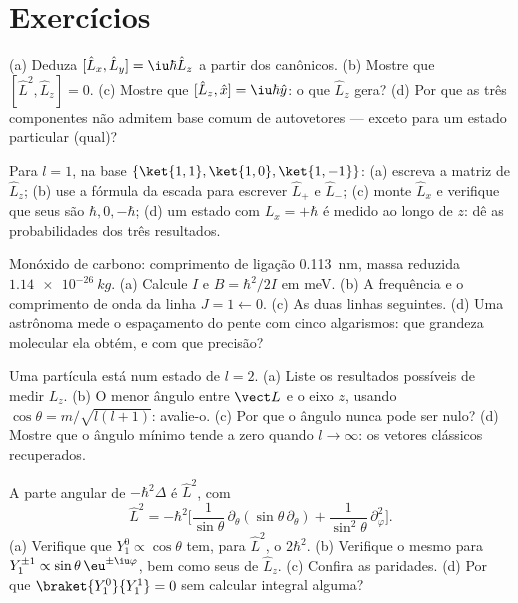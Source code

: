 \section{Exercícios}

\begin{exercise}[$\star$]\label{exo:b3:quantum-angular-momentum:1}
(a) Deduza $[\hat L_x, \hat L_y] = \iu\hbar\hat L_z$ a partir dos
 canônicos. (b) Mostre que $[\hat L^2, \hat L_z] = 0$. (c)
Mostre que $[\hat L_z, \hat x] = \iu\hbar\hat y$: o que $\hat L_z$
gera? (d) Por que as três componentes não admitem base comum de
autovetores --- exceto para um estado particular (qual)?
\end{exercise}

\begin{exercise}[$\star$]\label{exo:b3:quantum-angular-momentum:2}
Para $l = 1$, na base $\{\ket{1,1}, \ket{1,0}, \ket{1,-1}\}$:
(a) escreva a matriz de $\hat L_z$; (b) use a fórmula da escada para
escrever $\hat L_+$ e $\hat L_-$; (c) monte $\hat L_x$ e verifique que
seus  são $\hbar, 0, -\hbar$; (d) um estado com $L_x =
+\hbar$ é medido ao longo de $z$: dê as probabilidades dos três
resultados.
\end{exercise}

\begin{exercise}[$\star$]\label{exo:b3:quantum-angular-momentum:3}
Monóxido de carbono: comprimento de ligação \qty{0.113}{nm}, massa
reduzida $\qty{1.14e-26}{kg}$. (a) Calcule $I$ e $B = \hbar^2/2I$ em
meV. (b) A frequência e o comprimento de onda da linha
$J = 1 \leftarrow 0$. (c) As duas linhas seguintes. (d) Uma astrônoma
mede o espaçamento do pente com cinco algarismos: que grandeza
molecular ela obtém, e com que precisão?
\end{exercise}

\begin{exercise}[$\star$]\label{exo:b3:quantum-angular-momentum:4}
Uma partícula está num estado de $l = 2$. (a) Liste os resultados
possíveis de medir $L_z$. (b) O menor ângulo entre $\vect L$ e o eixo
$z$, usando $\cos\theta = m/\sqrt{l(l+1)}$: avalie-o. (c) Por que o
ângulo nunca pode ser nulo? (d) Mostre que o ângulo mínimo tende a zero
quando $l \to \infty$: os vetores clássicos recuperados.
\end{exercise}

\begin{exercise}[$\star\star$]\label{exo:b3:quantum-angular-momentum:5}
A parte angular de $-\hbar^2\Delta$ é $\hat L^2$, com
\[
\hat L^2 = -\hbar^2\Big[\frac{1}{\sin\theta}\,\partial_\theta
(\sin\theta\,\partial_\theta) +
\frac{1}{\sin^2\theta}\,\partial_\varphi^2\Big] .
\]
(a) Verifique que $Y_1^0 \propto \cos\theta$ tem, para $\hat L^2$, o 
$2\hbar^2$. (b) Verifique o mesmo para $Y_1^{\pm1} \propto \sin\theta\,
\eu^{\pm\iu\varphi}$, bem como seus  de $\hat L_z$. (c)
Confira as paridades. (d) Por que $\braket{Y_1^0}{Y_1^1} = 0$ sem
calcular integral alguma?
\end{exercise}

